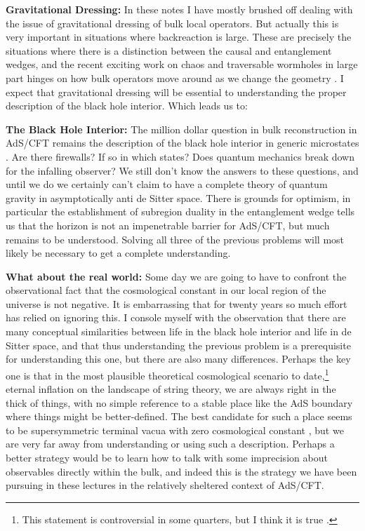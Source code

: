 \documentclass[toc]{PoS}
\begin{document}
\item \textbf{Gravitational Dressing:} In these notes I have mostly brushed off dealing with the issue of gravitational dressing of bulk local operators.  But actually this is very important in situations where backreaction is large.  These are precisely the situations where there is a distinction between the causal and entanglement wedges, and the recent exciting work on chaos and traversable wormholes in large part hinges on how bulk operators move around as we change the geometry \cite{Shenker:2013pqa,Gao:2016bin,Maldacena:2017axo}. I expect that gravitational dressing will be essential to understanding the proper description of the black hole interior.  Which leads us to:
\item \textbf{The Black Hole Interior:} The million dollar question in bulk reconstruction in AdS/CFT remains the description of the black hole interior in generic microstates \cite{Almheiri:2013hfa,Marolf:2013dba,Harlow:2014yka}.  Are there firewalls?  If so in which states?  Does quantum mechanics break down for the infalling observer?  We still don't know the answers to these questions, and until we do we certainly can't claim to have a complete theory of quantum gravity in asymptotically anti de Sitter space.  There is grounds for optimism, in particular the establishment of subregion duality in the entanglement wedge tells us that the horizon is not an impenetrable barrier for AdS/CFT, but much remains to be understood.  Solving all three of the previous problems will most likely be necessary to get a complete understanding.
\item \textbf{What about the real world:}  Some day we are going to have to confront the observational fact that the cosmological constant in our local region of the universe is not negative.  It is embarrassing that for twenty years so much effort has relied on ignoring this.  I console myself with the observation that there are many conceptual similarities between life in the black hole interior and life in de Sitter space, and that thus understanding the previous problem is a prerequisite for understanding this one, but there are also many differences.  Perhaps the key one is that in the most plausible theoretical cosmological scenario to date,\footnote{This statement is controversial in some quarters, but I think it is true \cite{Polchinski:2015pzt,Polchinski:2016xto,harlowinf}.} eternal inflation on the landscape of string theory, we are always right in the thick of things, with no simple reference to a stable place like the AdS boundary where things might be better-defined.  The best candidate for such a place seems to be supersymmetric terminal vacua with zero cosmological constant \cite{Susskind:2007pv,Harlow:2010my,Harlow:2012dd}, but we are very far away from understanding or using such a description. Perhaps a better strategy would be to learn how to talk with some imprecision about observables directly within the bulk, and indeed this is the strategy we have been pursuing in these lectures in the relatively sheltered context of AdS/CFT.
\end{document}
